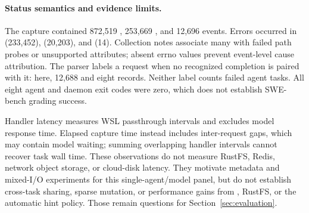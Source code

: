 \paragraph{Status semantics and evidence limits.}
The capture contained 872,519 , 253,669 , and 12,696
 events. Errors occurred in  (233,452),
 (20,203), and  (14). Collection notes associate
many with failed path probes or unsupported attributes; absent errno values
prevent event-level cause attribution. The parser labels a request
 when no recognized completion is paired with it: here,
12,688  and eight  records. Neither label counts
failed agent tasks. All eight agent and daemon exit codes were zero, which
does not establish SWE-bench grading success.

Handler latency measures WSL passthrough intervals and excludes model response
time. Elapsed capture time instead includes inter-request gaps, which may
contain model waiting; summing overlapping handler intervals cannot recover
task wall time. These observations do not measure RustFS, Redis, network
object storage, or cloud-disk latency. They motivate metadata and mixed-I/O
experiments for this single-agent/model panel, but do not establish cross-task
sharing, sparse mutation, or performance gains from \sysname, RustFS, or
the automatic hint policy. Those remain questions for
Section~\ref{sec:evaluation}.
